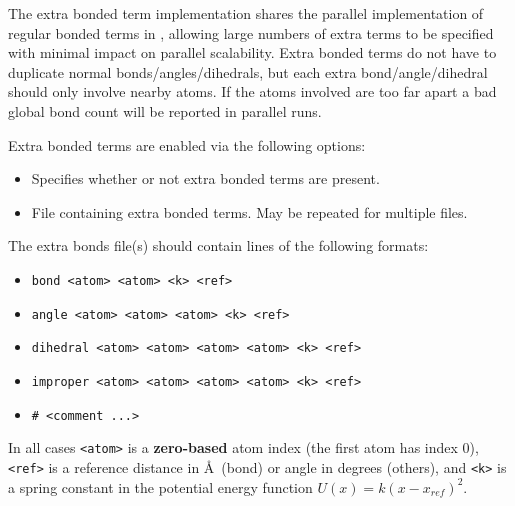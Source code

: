 The extra bonded term implementation shares the parallel implementation
of regular bonded terms in \NAMD, allowing large numbers of extra terms
to be specified with minimal impact on parallel scalability.
Extra bonded terms do not have to duplicate normal bonds/angles/dihedrals,
but each extra bond/angle/dihedral should only involve nearby atoms.
If the atoms involved are too far apart a bad global bond count will be
reported in parallel runs.

Extra bonded terms are enabled via the following options:

\begin{itemize}

\item
{}
{Specifies whether or not extra bonded terms are present.} 

\item
{}
{File containing extra bonded terms.  May be repeated for multiple files.} 

\end{itemize}

The extra bonds file(s) should contain lines of the following formats:

\begin{itemize}
\item
{\tt bond <atom> <atom> <k> <ref>}
\item
{\tt angle <atom> <atom> <atom> <k> <ref>}
\item
{\tt dihedral <atom> <atom> <atom> <atom> <k> <ref>}
\item
{\tt improper <atom> <atom> <atom> <atom> <k> <ref>}
\item
{\tt \# <comment ...>}
\end{itemize}

In all cases {\tt <atom>} is a {\bf zero-based} atom index
(the first atom has index 0),
{\tt <ref>} is a reference distance in \AA\ (bond) or angle in degrees (others),
and {\tt <k>} is a spring constant in the potential energy function
$U(x) = k (x-x_{ref})^2$.

